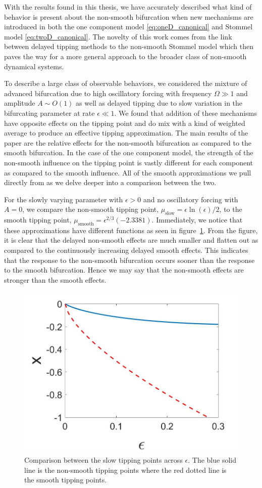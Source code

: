 With the results found in this thesis, we have accurately described what kind of behavior is present about the non-smooth bifurcation when new mechanisms are introduced in both the one component model \eqref{eq:oneD_canonical} and Stommel model \eqref{eq:twoD_canonical}. The novelty of this work comes from the link between delayed tipping methods to the non-smooth Stommel model which then paves the way for a more general approach to the broader class of non-smooth dynamical systems. 

\indent To describe a large class of observable behaviors, we considered the mixture of advanced bifurcation due to high oscillatory forcing with frequency $\Omega\gg 1$ and amplitude $A\sim O(1)$ as well as delayed tipping due to slow variation in the bifurcating parameter at rate $\epsilon\ll 1$. We found that addition of these mechanisms have opposite effects on the tipping point and do mix with a kind of weighted average to produce an effective tipping approximation. The main results of the paper are the relative effects for the non-smooth bifurcation as compared to the smooth bifurcation. In the case of the one component model, the strength of the non-smooth influence on the tipping point is vastly different for each component as compared to the smooth influence. All of the smooth approximations we pull directly from \cite{zhu2015tipping} as we delve deeper into a comparison between the two.

\indent For the slowly varying parameter with $\epsilon>0$ and no oscillatory forcing with $A=0$, we compare the non-smooth tipping point, $\mu_{\text{slow}}= \epsilon\ln(\epsilon)/2$, to the smooth tipping point, $\mu_{\text{smooth}}=\epsilon^{2/3}(-2.3381)$. Immediately, we notice that these approximations have different functions as seen in figure~\ref{fig:slow_comp}. From the figure, it is clear that the delayed non-smooth effects are much smaller and flatten out as compared to the continuously increasing delayed smooth effects. This indicates that the response to the non-smooth bifurcation occurs sooner than the response to the smooth bifurcation. Hence we may say that the non-smooth effects are stronger than the smooth effects.

\begin{figure}[H]
\centering
\includegraphics[width=.7\linewidth]{conclusion/slowcomp.jpg}
\caption{Comparison between the slow tipping points across $\epsilon$. The blue solid line is the non-smooth tipping points where the red dotted line is the smooth tipping points.}
\label{fig:slow_comp}
\end{figure}

